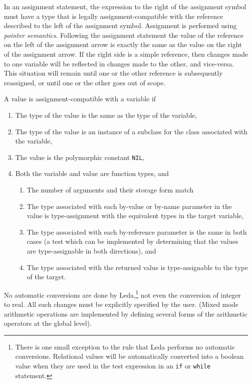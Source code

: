 In an assignment statement, the expression to the right of the assignment
symbol must have a type that is legally assignment-compatible with
the reference described to the left of the assignment symbol.
Assignment is performed using {\em pointer semantics}.
Following the assignment statement the value of the reference on the
left of the assignment arrow is exactly the same as the value on the right
of the assignment arrow.
If the right side is a simple reference, then changes made to one variable
will be reflected in changes made to the other, and vice-versa.
This situation will remain until one or the other reference is subsequently
reassigned, or until one or the other goes out of scope.

A value is assignment-compatible with a variable if
\begin{enumerate}
\item
The type of the value is the same as the type of the variable,
\item
The type of the value is an instance of a subclass for the class associated
with the variable,
\item
The value is the polymorphic constant {\tt NIL},
\item
Both the variable and value are function types, and
\begin{enumerate}
\item
The number of arguments and their storage form match
\item
The type associated with each by-value or by-name parameter in the value is
type-assignment with the equivalent types in the target variable,
\item
The type associated with each by-reference parameter is the same in both
cases (a test which can be implemented by determining that the values are
type-assignable in both directions), and
\item
The type associated with the returned value is type-assignable to the type of
the target.
\end{enumerate}
\end{enumerate}

No automatic conversions are done by Leda,\footnote{There is one small
exception to the rule that Leda performs no automatic conversions.
Relational values will be automatically converted into a boolean value
when they are used in the test expression in an {\tt if} or {\tt while}
statement.} not even the conversion of integer to real.
All such changes must be explicitly specified by the user.
(Mixed mode arithmetic operations are implemented by defining
several forms of the arithmetic operators at the global level).

